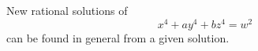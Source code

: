 \begin{proposition}
    New rational solutions of
\[
    x^4+ay^4+bz^4=w^2
\]
    can be found in general from a given solution.
\end{proposition}
